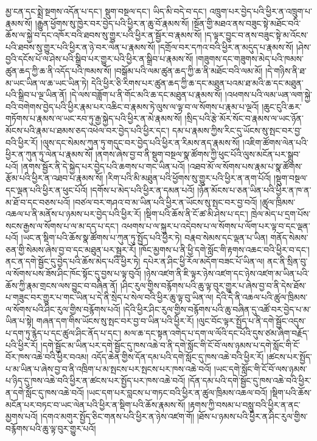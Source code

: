 མྱ་ངན་དང་སྨྲེ་སྔགས་འདོན་པ་དང་། སྡུག་བསྔལ་དང་། ཡིད་མི་བདེ་བ་དང་། འཁྲུག་པར་བྱེད་པའི་ཕྱིར་ན་འཁྲུག་པ་རྣམས་སོ། །རྒྱུན་ཕྱོགས་སུ་ཁྱེར་བར་བྱེད་པའི་ཕྱིར་ན་ཆུ་བོ་རྣམས་སོ། །སྔོན་གྱི་མཐའ་ནས་བཟུང་སྟེ་མཐོང་བའི་ཆོས་ལ་སྐྱེ་བ་དང་འཁོར་བའི་ཐབས་སུ་གྱུར་པའི་ཕྱིར་ན་སྦྱོར་བ་རྣམས་སོ། །ད་ལྟར་བྱུང་བ་ནས་བཟུང་སྟེ་མ་འོངས་པའི་ཐབས་སུ་གྱུར་པའི་ཕྱིར་ན་ཉེ་བར་ལེན་པ་རྣམས་སོ། །དགྲོལ་བར་དཀའ་བའི་ཕྱིར་ན་མདུད་པ་རྣམས་སོ། །ཤེས་བྱའི་དངོས་པོ་ལ་ཤེས་པའི་སྒྲིབ་པར་གྱུར་པའི་ཕྱིར་ན་སྒྲིབ་པ་རྣམས་སོ། །གཟུགས་དང་གཟུགས་མེད་པའི་ཁམས་ཚུན་ཆད་ཀྱི་ཆ་ནི་འདོད་པའི་ཁམས་སོ། །བསྒོམ་པའི་ལམ་ཚུན་ཆད་ཀྱི་ཆ་ནི་མཐོང་བའི་ལམ་མོ། །དེ་གཉིས་ནི་ཐ་མ་ཡང་ཡིན་ལ་ཆ་ཡང་ཡིན་ཏེ། དེའི་ཕྱིར་ཅི་རིགས་པར་ཚུན་ཆད་ཀྱི་ཆ་དང་མཐུན་པའམ་ཐ་མའི་ཆ་དང་མཐུན་པའི་སྒྲིབ་པ་ལྔ་ཡིན་ནོ། །དེ་ལས་བཟློག་པ་ནི་གོང་མའི་ཆ་དང་མཐུན་པ་རྣམས་སོ། །འཕགས་པའི་ལམ་ཡན་ལག་སྐྱེ་བའི་བགེགས་བྱེད་པའི་ཕྱིར་རྣམ་པར་འཆིང་བ་རྣམས་ཏེ་ལུས་ལ་ལྟ་བ་ལ་སོགས་པ་རྣམ་པ་ལྔའོ། །ཆུང་ངུའི་ཆར་གཏོགས་པ་རྣམས་ལ་ཡང་རབ་ཏུ་རྒྱ་སྐྱེད་པའི་ཕྱིར་ན་མེ་རྣམས་སོ། །སྲིད་པའི་རྩེ་མོར་སོང་བ་རྣམས་ལ་ཡང་ཉོན་མོངས་པའི་རྣམ་པ་ཐམས་ཅད་འཕེལ་བར་བྱེད་པའི་ཕྱིར་དང་། དམ་པ་རྣམས་ཀྱིས་རིང་དུ་ཡོངས་སུ་སྤང་བར་བྱ་བའི་ཕྱིར་རོ། །ལུས་དང་སེམས་ཀུན་ཏུ་གདུང་བར་བྱེད་པའི་ཕྱིར་ན་རིམས་ནད་རྣམས་སོ། །འཇིག་ཚོགས་ལེན་པའི་ཕྱིར་ན་ཀུན་ཏུ་ལེན་པ་རྣམས་སོ། །ནགས་ཞེས་བྱ་བ་ནི་སྡུག་བསྔལ་སྣ་ཚོགས་ཀྱི་ཕུང་པོའི་ལུས་མངོན་པར་སྒྲུབ་པའོ། །ནགས་སྦྱོར་ནི་དེ་སྐྱེད་པར་བྱེད་པའི་ཆགས་པ་གང་ཡིན་པའོ། །འཐབ་མོ་ལ་སོགས་པས་རྣམ་པ་སྣ་ཚོགས་རྩོམ་པའི་ཕྱིར་ན་འཐབ་པ་རྣམས་སོ། །རིག་པའི་མི་མཐུན་པའི་ཕྱོགས་སུ་གྱུར་པའི་ཕྱིར་ན་ནག་པོའོ། །སྡུག་བསྔལ་དང་ལྡན་པའི་ཕྱིར་ན་ཕུང་པོའོ། །དགོས་པ་མེད་པའི་ཕྱིར་ན་དམན་པའོ། །ཉོན་མོངས་པ་ཅན་ཡིན་པའི་ཕྱིར་ན་ཁ་ན་མ་ཐོ་བ་དང་བཅས་པའོ། །བཙལ་བར་གཤའ་བ་མ་ཡིན་པའི་ཕྱིར་ན་ཡོངས་སུ་སྤང་བར་བྱ་བའོ། །ཚུལ་ཁྲིམས་འཆལ་པ་ནི་མནོས་པ་ཉམས་པར་བྱེད་པའི་ཕྱིར་རོ། །སྡིག་པའི་ཆོས་ནི་ངོ་ཚ་མི་ཤེས་པ་དང་། ཁྲེལ་མེད་པ་དྲག་པོས་སངས་རྒྱས་ལ་སོགས་པ་ལ་མ་དད་པ་དང་། འཕགས་པ་ལ་སྐུར་པ་འདེབས་པ་ལ་སོགས་པ་ལོག་པར་ལྟ་བ་དང་ལྡན་པའོ། །ཡང་ན་སྡིག་པའི་ཆོས་སྣ་ཚོགས་པ་ཀུན་ཏུ་སྤྱོད་པའི་ཕྱིར་ཏེ། བརྣབ་སེམས་དང་ལྡན་པ་ཡིན། གནོད་སེམས་ཅན་གྱི་སེམས་ཞེས་བྱ་བ་དང་མཐུན་པར་སྦྱར་རོ། །ཁོང་མྱགས་པ་ནི་ཕྱི་དགེ་སློང་གི་རྟགས་འཆང་བའི་ཕྱིར་བ་དང་། ནང་ན་དགེ་སྦྱོང་དུ་བྱེད་པའི་ཆོས་མེད་པའི་ཕྱིར་ཏེ། དཔེར་ན་ཤིང་ཕྱི་རོལ་མདོག་བཟང་པོ་ཡིན་ལ། ནང་ནི་སྲིན་བུ་ལ་སོགས་པས་ཟོས་ཤིང་ཁོང་སྟོང་དུ་བྱས་པ་ལྟ་བུའོ། །ཉེས་འཛག་ནི་ཇི་ལྟར་ཉེས་འཛག་དང་ཉེས་འཛག་མ་ཡིན་པའི་ཆོས་ཀྱི་རྣམ་གྲངས་ལས་བྱུང་བ་བཞིན་ནོ། །ཤིང་རུལ་གྱིས་བརྙོགས་པའི་ཆུ་ལྟ་བུར་གྱུར་པ་ཞེས་བྱ་བ་ནི་དེས་ཐོས་པ་གཟུང་བར་གྱུར་པ་གང་ཡིན་པ་དེ་ནི་སྲེད་པ་སེལ་བའི་ཕྱིར་ཆུ་ལྟ་བུ་ཡིན་ལ། དེའི་དེ་ནི་འཆལ་པའི་ཚུལ་ཁྲིམས་ལ་སོགས་པའི་ཤིང་རུལ་གྱིས་བརྙོགས་པའོ། །དེའི་ཕྱིར་ཤིང་རུལ་གྱིས་བརྙོགས་པའི་ཆུ་བཞིན་དུ་འཚོ་བར་བྱེད་པ་མ་ཡིན་པ་སྟེ། གཞན་དག་གིས་ཡོངས་སུ་སྤང་བར་བྱ་བ་ཡིན་པའི་ཕྱིར་རོ། །ལུང་བོང་ལྟར་སྤྱོད་པ་ནི་དགེ་སྦྱོང་འདུས་པ་དག་ཏུ་རྙེད་པ་དང་ཚུལ་ཤིང་ནོད་པ་དང་། མལ་ཆ་དང་སྟན་འགེད་པ་དག་ལ་ལོའི་དང་པོའི་དུས་ཙམ་ཞིག་བརྗོད་པའི་ཕྱིར་རོ། །དགེ་སྦྱོང་མ་ཡིན་པར་དགེ་སྦྱོང་དུ་ཁས་འཆེ་བ་ནི་དགེ་སློང་གི་ངོ་བོ་ལས་ཉམས་པ་དགེ་སློང་གི་ངོ་བོར་ཁས་འཆེ་བའི་ཕྱིར་བའམ། འདོད་ཆེན་གྱིས་དོན་དམ་པའི་དགེ་སློང་དུ་ཁས་འཆེ་བའི་ཕྱིར་རོ། །ཚངས་པར་སྤྱོད་པ་མ་ཡིན་པ་ཞེས་བྱ་བ་ནི་འཁྲིག་པ་མ་སྤངས་པར་སྤངས་པར་ཁས་འཆེ་བའོ། །ཡང་དགེ་སློང་གི་ངོ་བོ་ལས་ཉམས་པ་ཉིད་དུ་ཁས་འཆེ་བའི་ཕྱིར་ན་ཚངས་པར་སྤྱོད་པར་ཁས་འཆེ་བའོ། །དོན་དམ་པའི་དགེ་སྦྱོང་དུ་ཁས་འཆེ་བའི་ཕྱིར་ན་དགེ་སློང་དུ་ཁས་འཆེ་བའོ། །ཡང་དག་པར་བླངས་པ་གཏང་བའི་ཕྱིར་ན་ཚུལ་ཁྲིམས་འཆལ་བའོ། །སྡིག་པའི་ཆོས་མངོན་པར་བཏང་བ་ཡང་ལེན་པའི་ཕྱིར་ན་སྡིག་པའི་ཆོས་རྣམས་སོ། །རྟགས་ཀྱི་བསམ་པ་བསླུ་བའི་ཕྱིར་ན་ནང་མྱགས་པའོ། །དགའ་མགུར་སྤྱོད་ཅིང་གནས་པའི་ཕྱིར་ན་ཉེས་འཛག་གོ། །ཐོས་པ་ཉམས་པའི་ཕྱིར་ན་ཤིང་རུལ་གྱིས་བརྙོགས་པའི་ཆུ་ལྟ་བུར་གྱུར་པའོ། 